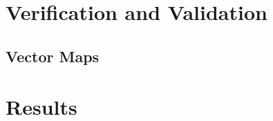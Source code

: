 \documentclass[12pt,twoside]{article}
\begin{document}
\section{Verification and Validation}
\label{section:VerificationAndValidation}

\subsection{Vector Maps}

\section{Results}
\label{section:Results}
\end{document}
